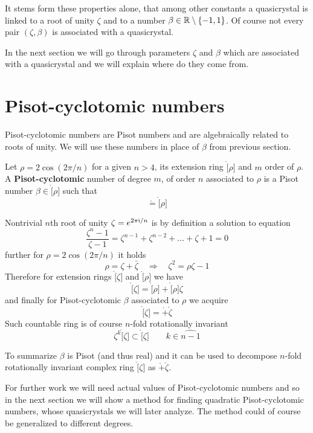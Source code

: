 \documentclass[text.tex]{subfiles}
\begin{document}
It stems form these properties alone, that among other constants a quasicrystal is linked to a root of unity $\zeta$ and to a number $\beta\in\mathbb{R}\setminus\{-1,1\}$. Of course not every pair $(\zeta, \beta)$ is associated with a quasicrystal.

In the next section we will go through parameters $\zeta$ and $\beta$ which are associated with a quasicrystal and we will explain where do they come from. 

\section{Pisot-cyclotomic numbers}\label{sec_pisotCyclotomic}%
Pisot-cyclotomic numbers are Pisot numbers and are algebraically related to roots of unity. We will use these numbers in place of $\beta$ from previous section. 

\begin{definition}\label{def_pisotCyclotomic}
Let $\rho = 2\cos\left(2\pi/n\right)$ for a given $n>4$, its extension ring $\ring[\rho]$ and $m$ order of $\rho$. A \textbf{Pisot-cyclotomic} number of degree $m$, of order $n$ associated to $\rho$ is a Pisot number $\beta \in \ring[\rho]$ such that
$$\ring = \ring[\rho]$$
\end{definition}

Nontrivial $n$th root of unity $\zeta = e^{2\pi \mathrm{i}/n}$ is by definition a solution to equation
$$\frac{\zeta^n-1}{\zeta-1} = \zeta^{n-1}+\zeta^{n-2}+\dots+\zeta+1 = 0$$
further for $\rho = 2\cos\left(2\pi/n\right)$ it holds
$$\rho = \zeta + \bar{\zeta}\quad\Rightarrow\quad \zeta^2 = \rho\zeta - 1$$
Therefore for extension rings $\ring[\zeta]$ and $\ring[\rho]$ we have
$$\ring[\zeta] = \ring[\rho] + \ring[\rho]\zeta$$
and finally for Pisot-cyclotomic $\beta$ associated to $\rho$ we acquire
$$\ring[\zeta] = \ring + \ring\zeta$$
Such countable ring is of course $n$-fold rotationally invariant
$$\zeta^k\ring[\zeta] \subset \ring[\zeta]\qquad k\in\widehat{n-1}$$

To summarize $\beta$ is Pisot (and thus real) and it can be used to decompose $n$-fold rotationally invariant complex ring $\ring[\zeta]$ as $\ring + \ring\zeta$. 

For further work we will need actual values of Pisot-cyclotomic numbers and so in the next section we will show a method for finding quadratic Pisot-cyclotomic numbers, whose quasicrystals we will later analyze. The method could of course be generalized to different degrees. 
\end{document}
